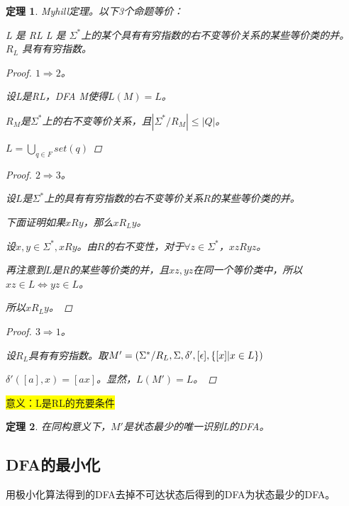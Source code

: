 \documentclass{ctexart}
\newcommand{\hl}[1]{\colorbox{yellow}{#1}}
\newtheorem{theorem}{定理}[section]
\DeclarePairedDelimiter{\set}{\{}{\}}
\begin{document}
\begin{theorem}
    Myhill定理。以下3个命题等价：
    \begin{outline}[enumerate]
        \1 L 是 RL
        \1 L 是 $\Sigma^*$上的某个具有有穷指数的右不变等价关系的某些等价类的并。
        \1 $R_L$ 具有有穷指数。
    \end{outline}

    \begin{proof}
        $1 \Rightarrow 2$。

        设L是RL，DFA M使得$L(M) = L$。

        $R_M$是$\Sigma^*$上的右不变等价关系，且$|\Sigma^* / R_M| \le |Q|$。

        $\displaystyle L = \bigcup_{q \in F}set(q)$
    \end{proof}

    \begin{proof}
        $2 \Rightarrow 3$。

        设$L$是$\Sigma^*$上的具有有穷指数的右不变等价关系$R$的某些等价类的并。

        下面证明如果$x R y$，那么$x R_L y$。

        设$x, y \in \Sigma^*, xRy$。由$R$的右不变性，对于$\forall z \in \Sigma^*$，$xzRyz$。

        再注意到$L$是$R$的某些等价类的并，且$xz,yz$在同一个等价类中，所以$xz \in L \iff yz \in L$。
        
        所以$x R_L y$。
    \end{proof}

    \begin{proof}
        $3 \Rightarrow 1$。
        
        设$R_L$具有有穷指数。取$M' = (\Sigma^*/R_L, \Sigma, \delta', [\epsilon], \set{[x] | x \in L})$

        $\delta'([a], x) = [ax]$。显然，$L(M') = L$。
    \end{proof}
\end{theorem}

\hl{意义：L是RL的充要条件}

\begin{theorem}
    在同构意义下，$M'$是状态最少的唯一识别L的DFA。
\end{theorem}

\subsection{DFA的最小化}
用极小化算法得到的DFA去掉不可达状态后得到的DFA为状态最少的DFA。
\end{document}
